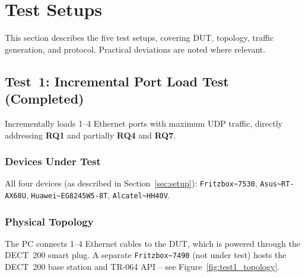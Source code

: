 \section{Test Setups}
\label{sec:test-setups}

This section describes the five test setups, covering \ac{DUT}, topology, traffic generation, and protocol. Practical deviations are noted where relevant.

\subsection{Test~1: Incremental Port Load Test (Completed)}
\label{sec:test-incremental-port-load}

Incrementally loads 1--4 Ethernet ports with maximum \ac{UDP} traffic, directly addressing \textbf{RQ1} and partially \textbf{RQ4} and \textbf{RQ7}.

\subsubsection{Devices Under Test}
All four devices (as described in Section~\ref{sec:setup}): \verb|Fritzbox~7530|, \verb|Asus~RT-AX68U|, \verb|Huawei~EG8245W5-8T|, \verb|Alcatel~HH40V|.

\subsubsection{Physical Topology}
The PC connects 1--4 Ethernet cables to the \ac{DUT}, which is powered through the \ac{DECT}~200 smart plug. A separate \verb|Fritzbox~7490| (not under test) hosts the \ac{DECT}~200 base station and TR-064 \ac{API} -- see Figure~\ref{fig:test1_topology}.

